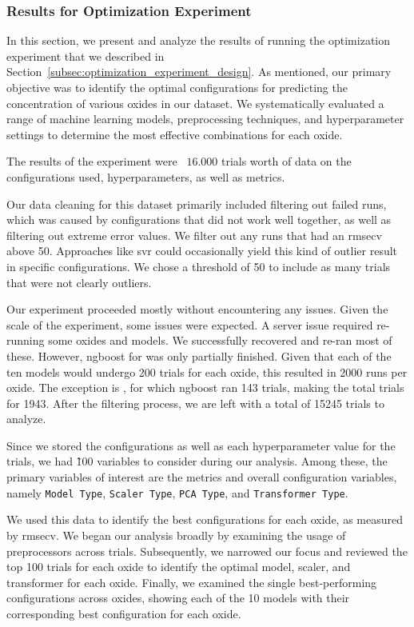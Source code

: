 \subsubsection{Results for Optimization Experiment}\label{sec:optimization_results}
In this section, we present and analyze the results of running the optimization experiment that we described in Section~\ref{subsec:optimization_experiment_design}.
As mentioned, our primary objective was to identify the optimal configurations for predicting the concentration of various oxides in our dataset.
We systematically evaluated a range of machine learning models, preprocessing techniques, and hyperparameter settings to determine the most effective combinations for each oxide.

The results of the experiment were ~$16.000$ trials worth of data on the configurations used, hyperparameters, as well as metrics.

Our data cleaning for this dataset primarily included filtering out failed runs, which was caused by configurations that did not work well together, as well as filtering out extreme error values.
We filter out any runs that had an \gls{rmsecv} above 50.
Approaches like \gls{svr} could occasionally yield this kind of outlier result in specific configurations.
We chose a threshold of 50 to include as many trials that were not clearly outliers.

Our experiment proceeded mostly without encountering any issues.
Given the scale of the experiment, some issues were expected.
A server issue required re-running some oxides and models. We successfully recovered and re-ran most of these.
However, \gls{ngboost} for  was only partially finished.
Given that each of the ten models would undergo 200 trials for each oxide, this resulted in 2000 runs per oxide.
The exception is , for which \gls{ngboost} ran 143 trials, making the total trials for  1943.
After the filtering process, we are left with a total of 15245 trials to analyze.

Since we stored the configurations as well as each hyperparameter value for the trials, we had \~100 variables to consider during our analysis.
Among these, the primary variables of interest are the metrics and overall configuration variables, namely \texttt{Model Type}, \texttt{Scaler Type}, \texttt{PCA Type}, and \texttt{Transformer Type}.

We used this data to identify the best configurations for each oxide, as measured by \gls{rmsecv}.
We began our analysis broadly by examining the usage of preprocessors across trials. Subsequently, we narrowed our focus and reviewed the top 100 trials for each oxide to identify the optimal model, scaler, and transformer for each oxide.
Finally, we examined the single best-performing configurations across oxides, showing each of the 10 models with their corresponding best configuration for each oxide.

